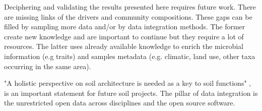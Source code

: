 Deciphering and validating the results presented here requires future work.
There are missing links of the drivers and community compositions. These 
gaps can be filled by sampling more data and/or by data integration methods.
The former create new knowledge and are important to continue but they 
require a lot of resources. The latter uses already available knowledge 
to enrich the microbial information (e.g traits) and samples metadata
(e.g. climatic, land use, other taxa occurring in the same area).

"A holistic perspective on soil architecture is needed as a key to soil functions" \parencite{philippot2024the-interplay}, is 
an important statement for future soil projects.
The pillar of data integration is the unrestricted open data across disciplines and 
the open source software. 


